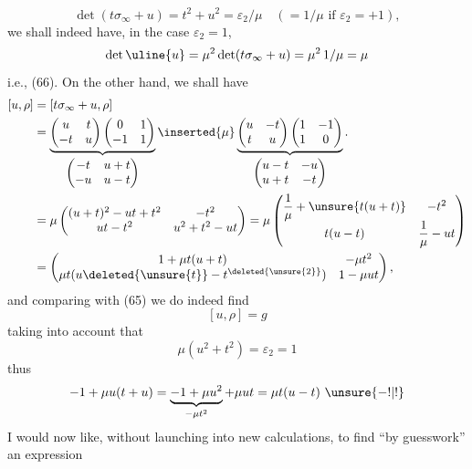 
\[
\det(t\sigma_\infty+u)=t^2+u^2=\varepsilon_2/\mu
\quad(=1/\mu\text{ if }\varepsilon_2=+1),
\]
we shall indeed have, in the case $\varepsilon_2=1$, 
\[
\det\uline{u}=\mu^2\det(t\sigma_\infty+u)=\mu^2\,1/\mu=\mu
\]
i.e., (66). On the other hand, we shall have
\[
\begin{aligned}
[u,\rho]&=[t\sigma_\infty+u,\rho]\\
&=
\underbrace{
\begin{pmatrix}u&t\\-t&u\end{pmatrix}
\begin{pmatrix}0&1\\-1&1\end{pmatrix}
}_{\begin{pmatrix}-t&u+t\\-u&u-t\end{pmatrix}}
\inserted{\mu}
\underbrace{
\begin{pmatrix}u&-t\\t&u\end{pmatrix}
\begin{pmatrix}1&-1\\1&0\end{pmatrix}
}_{\begin{pmatrix}u-t&-u\\u+t&-t\end{pmatrix}}.
\\
&=\mu\begin{pmatrix}
(u+t)^2-ut+t^2&-t^2\\
ut-t^2&u^2+t^2-ut
\end{pmatrix}
=\mu\begin{pmatrix}
\dfrac1\mu+\unsure{t(u+t)}&-t^2\\
t(u-t)&\dfrac1\mu-ut
\end{pmatrix}
\\
&=\begin{pmatrix}
1+\mu t(u+t)&-\mu t^2\\
\mu t(u\deleted{\unsure{t}}-t^{\deleted{\unsure{2}}})&1-\mu ut
\end{pmatrix},
\end{aligned}
\]
and comparing with (65) we do indeed find
\[
[u,\rho]=g
\]
taking into account that
\[
\mu(u^2+t^2)=\varepsilon_2=1
\]
thus
\[
-1+\mu u(t+u)=\underbrace{-1+\mu u^2}_{-\mu t^2}+\mu ut
=\mu t(u-t)\ \unsure{-!|!}
\]
I would now like, without launching into
new calculations, to find ``by guesswork'' an expression
